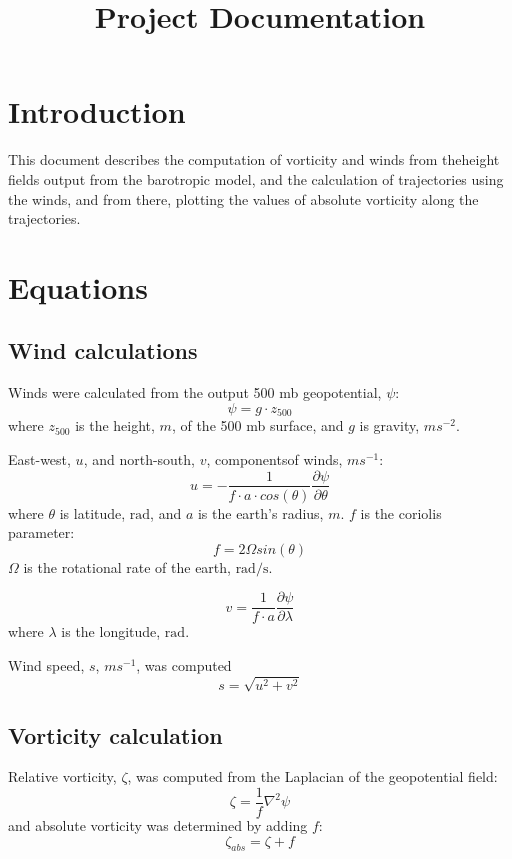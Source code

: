 \documentclass{article}
\begin{document}
\title{Project Documentation}
\section{Introduction}
This document describes the computation of vorticity and winds from theheight fields output from the barotropic model, and the calculation of trajectories using the winds, and from there, plotting the values of absolute vorticity along the trajectories.

\section{Equations}

\subsection{Wind calculations}
Winds were calculated from the output 500 mb geopotential, $\psi$:
\begin{equation}
  \psi = g \cdot z_{500}
\end{equation}
where $z_{500}$ is the height, $m$, of the 500 mb surface, and $g$ is
gravity, $ms^{-2}$.

East-west, $u$, and north-south, $v$, componentsof winds, $ms^{-1}$:
\begin{equation}
u  = - \frac{1}{f \cdot a \cdot cos(\theta)}\frac{\partial \psi}{\partial \theta}
\end{equation}
where $\theta$ is latitude, $\text{rad}$, and $a$ is the earth's radius, $m$.
$f$ is the coriolis parameter:
\begin{equation}
  f = 2 \Omega sin(\theta)
\end{equation}
$\Omega$ is the rotational rate of the earth, $\text{rad/s}$.

\begin{equation}
v  =  \frac{1}{f \cdot a }\frac{\partial \psi}{\partial \lambda}
\end{equation}
 where $\lambda$ is the longitude, $\text{rad}$.

Wind speed, $s$, $m s^{-1}$, was computed
 \begin{equation}
   s = \sqrt{u^2 + v^2}
   \end{equation}

\subsection{Vorticity calculation}
 Relative vorticity, $\zeta$, was computed from the Laplacian of the geopotential field:
 \begin{equation}
   \zeta = \frac{1}{f}\nabla^{2}\psi
 \end{equation}
 and absolute vorticity was determined by adding $f$:
 \begin{equation}
   \zeta_{abs} = \zeta + f
 \end{equation}
 
\end{document}
